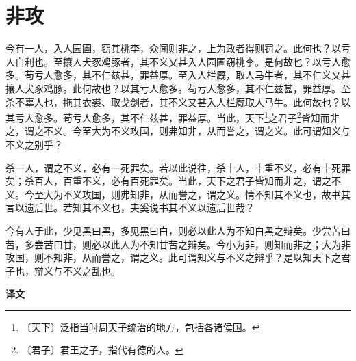 \documentclass[12pt,UTF-8,openany,a4]{ctexbook}
\begin{document}
\chapter{非攻}

\begin{large}
    
    今有一人，入人园圃，窃其桃李，众闻则非之，上为政者得则罚之。此何也？以亏人自利也。至攘人犬豕鸡豚者，其不义又甚入人园圃窃桃李。是何故也？以亏人愈多。苟亏人愈多，其不仁兹甚，罪益厚。至入人栏厩，取人马牛者，其不仁义又甚攘人犬豕鸡豚。此何故也？以其亏人愈多。苟亏人愈多，其不仁兹甚，罪益厚。至杀不辜人也，拖其衣裘、取戈剑者，其不义又甚入人栏厩取人马牛。此何故也？以其亏人愈多。苟亏人愈多，其不仁兹甚，罪益厚。当此，天下\footnote{〔天下〕\yiwen 泛指当时周天子统治的地方，包括各诸侯国。}之君子\footnote{〔君子〕\yiwen 君王之子，指代有德的人。}皆知而非之，谓之不义。今至大为不义攻国，则弗知非，从而誉之，谓之义。此可谓知义与不义之别乎？
    
    杀一人，谓之不义，必有一死罪矣。若以此说往，杀十人，十重不义，必有十死罪矣；杀百人，百重不义，必有百死罪矣。当此，天下之君子皆知而非之，谓之不义。今至大为不义攻国，则弗知非，从而誉之，谓之义。情不知其不义也，故书其言以遗后世。若知其不义也，夫奚说书其不义以遗后世哉？
    
    今有人于此，少见黑曰黑，多见黑曰白，则必以此人为不知白黑之辩矣。少尝苦曰苦，多尝苦曰甘，则必以此人为不知甘苦之辩矣。今小为非，则知而非之；大为非攻国，则不知非，从而誉之，谓之义。此可谓知义与不义之辩乎？是以知天下之君子也，辩义与不义之乱也。
\end{large}


\newpage

\begin{Large}
    \noindent\textbf{译文}
\end{Large}


\vspace{1em}
\end{document}
